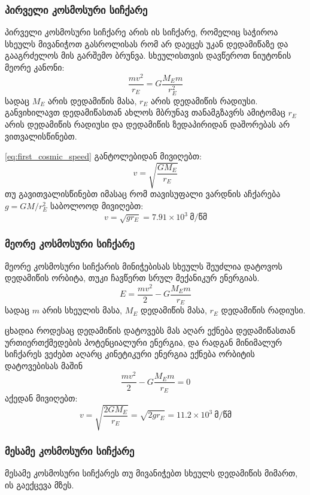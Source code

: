 \documentclass[a4paper]{book}
\begin{document}
\subsubsection{პირველი კოსმოსური სიჩქარე}
პირველი კოსმოსური სიჩქარე არის ის სიჩქარე, რომელიც საჭიროა სხეულს მივანიჭოთ გასროლისას რომ არ დაეცეს უკან დედამიწაზე და გააგრძელოს მის გარშემო ბრუნვა. სხეულისთვის დავწეროთ ნიუტონის მეორე კანონი:
		\begin{equation}
			\frac{mv^2}{r_E} = G\frac{M_Em}{r_E^2}
			\label{eq:first_cosmic_speed}
		\end{equation}
სადაც $M_E$ არის დედამიწის მასა, $r_E$ არის დედამიწის რადიუსი. განვიხილავთ დედამიწასთან ახლოს მბრუნავ თანამგზავრს ამიტომაც $r_E$ არის დედამიწის რადიუსი და დედამიწის ზედაპირიდან დაშორებას არ ვითვალისწინებთ.

\ref{eq:first_cosmic_speed} განტოლებიდან მივიღებთ:
	\begin{equation}
		v = \sqrt{\frac{G M_E}{r_E}}
	\end{equation}
თუ გავითვალისწინებთ იმასაც რომ თავისუფალი ვარდნის აჩქარება $g = GM/r_E^2$ საბოლოოდ მივიღებთ:
	\begin{equation}
		v = \sqrt{g r_E} = 7.91 \times 10^3 ~ \text{მ/წმ}
	\end{equation}
	
\subsubsection{მეორე კოსმოსური სიჩქარე}
მეორე კოსმოსური სიჩქარის მინიჭებისას სხეულს შეუძლია დატოვოს დედამიწის ორბიტა, თუკი ჩავწერთ სრულ მექანიკურ ენერგიას. 
			\begin{equation}
				E = \frac{mv^2}{2} - G\frac{M_E m}{r_E}
			\end{equation}
სადაც $m$ არის სხეულის მასა, $M_E$ დედამიწის მასა, $r_E$ დედამიწის რადიუსი. 

ცხადია როდესაც დედამიწის დატოვებს მას აღარ ექნება დედამიწასთან ურთიერთქმედების პოტენციალური ენერგია, და რადგან მინიმალურ სიჩქარეს ვეძებთ აღარც კინეტიკური ენერგია ექნება ორბიტის დატოვებისას მაშინ
			\begin{equation}
				\frac{mv^2}{2} - G\frac{M_E m}{r_E} = 0
			\end{equation}
აქედან მივიღებთ:
			\begin{equation}
				v = \sqrt{\frac{2GM_E}{r_E}} = \sqrt{2 g r_E} = 11.2 \times 10^3 ~ \text{მ/წმ}
			\end{equation}

\subsubsection{მესამე კოსმოსური სიჩქარე}
მესამე კოსმოსური სიჩქარეს თუ მივანიჭებთ სხეულს დედამიწის მიმართ, ის გაექცევა მზეს.
\end{document}
